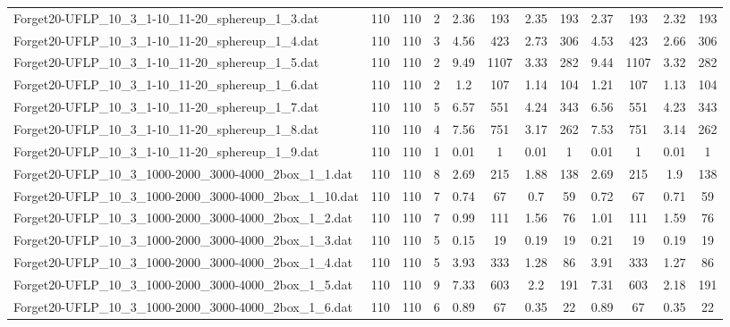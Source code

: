 \begin{sidewaystable}[!ht]
{\begin{tabular}{lccccccccccc}
Forget20-UFLP\_10\_3\_1-10\_11-20\_sphereup\_1\_3.dat & 110 & 110 & 2 & 2.36 & 193 & 2.35 & 193 & 2.37 & 193 &  \textcolor{blue2}{2.32} & 193 \\
Forget20-UFLP\_10\_3\_1-10\_11-20\_sphereup\_1\_4.dat & 110 & 110 & 3 & 4.56 & 423 & 2.73 & 306 & 4.53 & 423 &  \textcolor{blue2}{2.66} & 306 \\
Forget20-UFLP\_10\_3\_1-10\_11-20\_sphereup\_1\_5.dat & 110 & 110 & 2 & 9.49 & 1107 & 3.33 & 282 & 9.44 & 1107 &  \textcolor{blue2}{3.32} & 282 \\
Forget20-UFLP\_10\_3\_1-10\_11-20\_sphereup\_1\_6.dat & 110 & 110 & 2 & 1.2 & 107 & 1.14 & 104 & 1.21 & 107 &  \textcolor{blue2}{1.13} & 104 \\
Forget20-UFLP\_10\_3\_1-10\_11-20\_sphereup\_1\_7.dat & 110 & 110 & 5 & 6.57 & 551 & 4.24 & 343 & 6.56 & 551 & 4.23 & 343 \\
Forget20-UFLP\_10\_3\_1-10\_11-20\_sphereup\_1\_8.dat & 110 & 110 & 4 & 7.56 & 751 & 3.17 & 262 & 7.53 & 751 &  \textcolor{blue2}{3.14} & 262 \\
Forget20-UFLP\_10\_3\_1-10\_11-20\_sphereup\_1\_9.dat & 110 & 110 & 1 &  \textcolor{blue2}{0.01} & 1 &  \textcolor{blue2}{0.01} & 1 &  \textcolor{blue2}{0.01} & 1 &  \textcolor{blue2}{0.01} & 1 \\
Forget20-UFLP\_10\_3\_1000-2000\_3000-4000\_2box\_1\_1.dat & 110 & 110 & 8 & 2.69 & 215 &  \textcolor{blue2}{1.88} & 138 & 2.69 & 215 & 1.9 & 138 \\
Forget20-UFLP\_10\_3\_1000-2000\_3000-4000\_2box\_1\_10.dat & 110 & 110 & 7 & 0.74 & 67 &  \textcolor{blue2}{0.7} & 59 & 0.72 & 67 & 0.71 & 59 \\
Forget20-UFLP\_10\_3\_1000-2000\_3000-4000\_2box\_1\_2.dat & 110 & 110 & 7 &  \textcolor{blue2}{0.99} & 111 & 1.56 & 76 & 1.01 & 111 & 1.59 & 76 \\
Forget20-UFLP\_10\_3\_1000-2000\_3000-4000\_2box\_1\_3.dat & 110 & 110 & 5 &  \textcolor{blue2}{0.15} & 19 & 0.19 & 19 & 0.21 & 19 & 0.19 & 19 \\
Forget20-UFLP\_10\_3\_1000-2000\_3000-4000\_2box\_1\_4.dat & 110 & 110 & 5 & 3.93 & 333 & 1.28 & 86 & 3.91 & 333 &  \textcolor{blue2}{1.27} & 86 \\
Forget20-UFLP\_10\_3\_1000-2000\_3000-4000\_2box\_1\_5.dat & 110 & 110 & 9 & 7.33 & 603 & 2.2 & 191 & 7.31 & 603 &  \textcolor{blue2}{2.18} & 191 \\
Forget20-UFLP\_10\_3\_1000-2000\_3000-4000\_2box\_1\_6.dat & 110 & 110 & 6 & 0.89 & 67 &  \textcolor{blue2}{0.35} & 22 & 0.89 & 67 &  \textcolor{blue2}{0.35} & 22 \\

\end{tabular}}
\end{sidewaystable}

